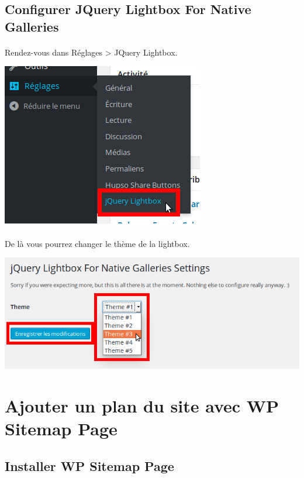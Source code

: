 \documentclass[10pt,a4paper]{article}
\begin{document}
\subsection{Configurer JQuery Lightbox For Native Galleries}
\paragraph{}Rendez-vous dans Réglages > JQuery Lightbox.
\begin{center}
\includegraphics[scale=0.3]{img/0262.png}
\end{center}
\paragraph{}De là vous pourrez changer le thème de la lightbox.
\begin{center}
\includegraphics[scale=0.3]{img/0263.png}
\end{center}
\newpage
\section{Ajouter un plan du site avec WP Sitemap Page}
\subsection{Installer WP Sitemap Page}
\end{document}
